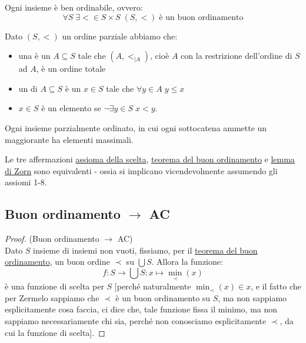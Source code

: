 \begin{theorem}
	\label{buon_ordinamento}
	Ogni insieme è ben ordinabile, ovvero:
	\[ \forall S \; \exists < \in S \times S \; (S,<)\;\text{è un buon ordinamento}
		\]
\end{theorem}

\begin{definition}
	Dato $(S,<)$ un ordine parziale abbiamo che:
	\begin{itemize}
		\item una  è un $A \subseteq S$ tale che $(A,<_{|A})$, cioè $A$ con la restrizione dell'ordine di $S$ ad $A$, è un ordine totale
		\item un  di $A \subseteq S$ è un $x \in S$ tale che $\forall y \in A \; y \leq x$
		\item $x \in S$ è un elemento  se $\neg \exists y \in S \; x < y$.
	\end{itemize}
\end{definition}

\begin{lemma}
	\label{Zorn}
	Ogni insieme parzialmente ordinato, in cui ogni sottocatena ammette un maggiorante ha elementi massimali.
\end{lemma}

\begin{theorem}
	Le tre affermazioni \hyperref[ax9]{assioma della scelta}, \hyperref[buon_ordinamento]{teorema del buon ordinamento} e \hyperref[Zorn]{lemma di Zorn} sono equivalenti -
	ossia si implicano vicendevolmente assumendo gli assiomi 1-8.
\end{theorem}

\subsection{\texorpdfstring{Buon ordinamento $\rightarrow$ AC}{Buon ordinamento implica AC}}

\begin{proof}
	(Buon ordinamento $\rightarrow$ AC)\\
	Dato $S$ insieme di insiemi non vuoti, fissiamo, per il \hyperref[buon_ordinamento]{teorema del buon ordinamento}, un buon ordine $\prec$ su $\bigcup S$. Allora la funzione:
	\[ f : S \rightarrow \bigcup S : x \mapsto \min_{\prec}(x)
		\]
	è una funzione di scelta per $S$ [perché naturalmente $\min_\prec (x) \in x$, e il fatto che per Zermelo sappiamo che $\prec$ è un buon ordinamento su $S$, ma non sappiamo esplicitamente cosa faccia, ci dice che, tale funzione fissa il minimo, ma non sappiamo necessariamente chi sia, perché non 
	conosciamo esplicitamente $\prec$, da cui la funzione di scelta].
\end{proof}

